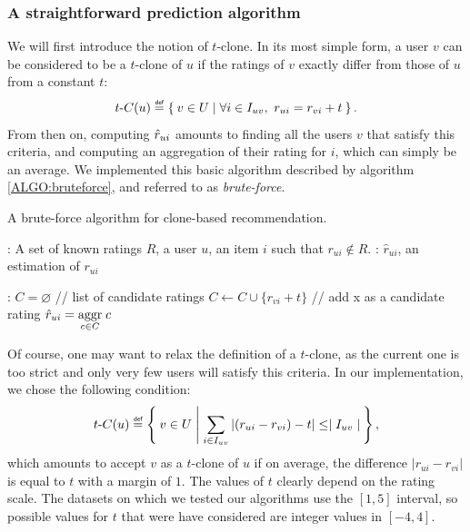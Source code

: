 \subsubsection{A straightforward prediction algorithm}
\label{STRAIGHTFORWARD}

We will first introduce the notion of $t$-clone. In its most simple form, a
user $v$ can be considered to be a $t$-clone of $u$ if the ratings of $v$
exactly differ from those of $u$ from a constant $t$:
$$
t\text{-}C(u) \eqdef \Set{v \in U | \forall i \in I_{uv},~ r_{ui} = r_{vi} + t}.
$$
From then on, computing $\hat{r}_{ui}$ amounts to finding all the users $v$ that
satisfy this criteria, and computing an aggregation of their rating for $i$,
which can simply be an average. We implemented this basic algorithm described
by algorithm \ref{ALGO:bruteforce}, and referred to as \textit{brute-force}.

 \begin{algorithm}[!ht]
   \caption{A brute-force algorithm for clone-based recommendation.}
       \label{ALGO:bruteforce}
       \begin{algorithmic}

      : A set of known ratings $R$, a user $u$, an item
      $i$ such that $r_{ui} \notin R$.
      : $\hat{r}_{ui}$, an estimation of $r_{ui}$

      :
      \STATE $C = \varnothing$ \quad \quad // list of candidate ratings
          \STATE $C \gets C \cup \{r_{vi} + t\}$ \quad // add x as a candidate rating
          \ENDIF
        \ENDFOR
	    \ENDFOR
    \STATE $\hat{r}_{ui} = \underset{c \in C}{\operatorname{aggr}}\; c$
\end{algorithmic}
\end{algorithm}

Of course, one may want to relax the definition of a $t$-clone, as the current
one is too strict and only very few users will satisfy this criteria. In our
implementation, we chose the following condition:
$$
t\text{-}C(u) \eqdef \Set{v \in U |  \sum_{i \in I_{uv}} |(r_{ui} - r_{vi}) -
t| \leq \mid I_{uv}\mid},$$
which amounts to accept $v$ as a $t$-clone of $u$ if on average, the
difference $|r_{ui} - r_{vi}|$ is equal to $t$ with a margin of $1$.
The values of $t$ clearly depend on the rating scale. The datasets on which we
tested our algorithms use the $[1, 5]$ interval, so possible values for $t$
that were have considered are integer values in $[-4, 4]$.

